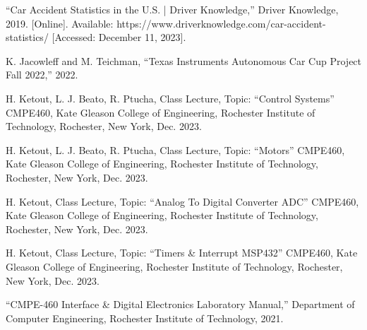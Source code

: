 \documentclass[conference]{IEEEtran}
\begin{document}
\begin{thebibliography}{00}

 “Car Accident Statistics in the U.S. | Driver Knowledge,” Driver Knowledge, 2019. [Online]. Available: https://www.driverknowledge.com/car-accident-statistics/ [Accessed: December 11, 2023].

 K. Jacowleff and M. Teichman, “Texas Instruments Autonomous Car Cup Project Fall 2022,” 2022.

 H. Ketout, L. J. Beato, R. Ptucha, Class Lecture, Topic: “Control Systems” CMPE460, Kate Gleason College of Engineering, Rochester Institute of Technology, Rochester, New York, Dec. 2023.

 H. Ketout, L. J. Beato, R. Ptucha, Class Lecture, Topic: “Motors” CMPE460, Kate Gleason College of Engineering, Rochester Institute of Technology, Rochester, New York, Dec. 2023.

 H. Ketout, Class Lecture, Topic: “Analog To Digital Converter ADC” CMPE460, Kate Gleason College of Engineering, Rochester Institute of Technology, Rochester, New York, Dec. 2023.

 H. Ketout, Class Lecture, Topic: “Timers \& Interrupt MSP432” CMPE460, Kate Gleason College of Engineering, Rochester Institute of Technology, Rochester, New York, Dec. 2023.

 “CMPE-460 Interface \& Digital Electronics Laboratory Manual,” Department of Computer Engineering, Rochester Institute of Technology, 2021.

\end{thebibliography}
\end{document}
